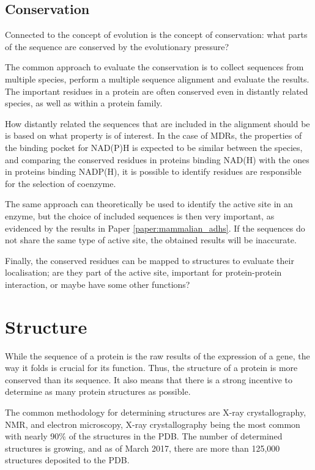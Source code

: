 \documentclass[a4paper, twoside, 12pt, openright]{report}
\begin{document}
\subsection{Conservation}
\label{sec:conservation}

Connected to the concept of evolution is the concept of conservation: what parts of the sequence are conserved by the evolutionary pressure?

The common approach to evaluate the conservation is to collect sequences from multiple species, perform a multiple sequence alignment and evaluate the results. The important residues in a protein are often conserved even in distantly related species, as well as within a protein family.

How distantly related the sequences that are included in the alignment should be is based on what property is of interest. In the case of MDRs, the properties of the binding pocket for NAD(P)H is expected to be similar between the species, and comparing the conserved residues in proteins binding NAD(H) with the ones in proteins binding NADP(H), it is possible to identify residues are responsible for the selection of coenzyme.

The same approach can theoretically be used to identify the active site in an enzyme, but the choice of included sequences is then very important, as evidenced by the results in Paper \ref{paper:mammalian_adhs}. If the sequences do not share the same type of active site, the obtained results will be inaccurate.

Finally, the conserved residues can be mapped to structures to evaluate their localisation; are they part of the active site, important for protein-protein interaction, or maybe have some other functions?


\section{Structure}
\label{sec:methods_structure}

While the sequence of a protein is the raw results of the expression of a gene, the way it folds is crucial for its function. Thus, the structure of a protein is more conserved than its sequence. It also means that there is a strong incentive to determine as many protein structures as possible.

The common methodology for determining structures are X-ray crystallography, NMR, and electron microscopy, X-ray crystallography being the most common with nearly 90\% of the structures in the PDB. The number of determined structures is growing, and as of March 2017, there are more than 125,000 structures deposited to the PDB\cite{noauthor_rcsb_nodate}.
\end{document}
